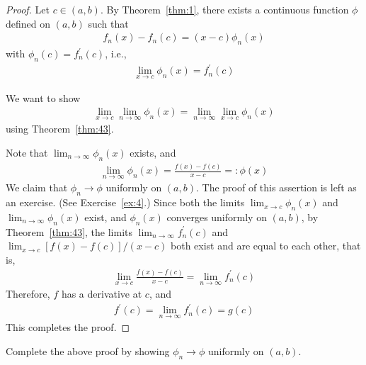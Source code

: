 \documentclass[thmcnt=section, 12pt]{my-elegantbook}
\begin{document}
\begin{proof}
    Let $c \in (a, b)$. By Theorem~\ref{thm:1}, there exists a continuous function $\phi$ defined on $(a, b)$ such that
    \begin{align*}
        f_n(x) - f_n(c) = (x - c) \phi_n(x)
    \end{align*}
    with $\phi_n(c) = f^\prime_n(c)$, i.e., 
    \begin{align*}
        \lim_{x \to c} \phi_n(x)=  f^\prime_n(c)
    \end{align*}
    \begin{note}
        We want to show 
        \begin{align*}
            \lim_{x \to c} \lim_{n \to \infty} \phi_n(x)
            = \lim_{n \to \infty} \lim_{x \to c} \phi_n(x)
        \end{align*}
        using Theorem~\ref{thm:43}.
    \end{note}
    Note that $\lim_{n \to \infty}\phi_n(x)$ exists, and 
    \begin{align*}
        \lim_{n \to \infty}\phi_n(x) = \frac{f(x) - f(c)}{x - c} =: \phi(x)
    \end{align*}
    We claim that $\phi_n \to \phi$ uniformly on $(a, b)$. The proof of this assertion is left as an exercise. (See Exercise~\ref{ex:4}.) Since both the limits $\lim_{x \to c} \phi_n(x)$ and $\lim_{n \to \infty} \phi_n(x)$ exist, and $\phi_n(x)$ converges uniformly on $(a, b)$, by Theorem~\ref{thm:43}, the limits $\lim_{n \to \infty} f^\prime_n(c)$ and $\lim_{x \to c} [f(x) - f(c)] / (x - c)$ both exist and are equal to each other, that is, 
    \begin{align*}
        \lim_{x \to c} \frac{f(x) - f(c)}{x - c}
        = \lim_{n \to \infty} f^\prime_n(c)
    \end{align*}
    Therefore, $f$ has a derivative at $c$, and 
    \begin{align*}
        f^\prime(c) = \lim_{n \to \infty} f^\prime_n(c) = g(c)
    \end{align*}
    This completes the proof.
\end{proof}

\begin{exercise}
    Complete the above proof by showing $\phi_n \to \phi$ uniformly on $(a, b)$.
    \label{ex:4}
\end{exercise}
\end{document}
